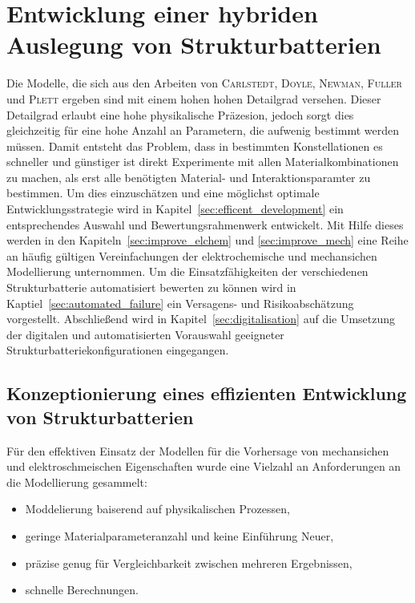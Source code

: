 \chapter{Entwicklung einer hybriden Auslegung von Strukturbatterien}
Die Modelle, die sich aus den Arbeiten von \textsc{Carlstedt}, \textsc{Doyle}, \textsc{Newman}, \textsc{Fuller} und \textsc{Plett} ergeben sind mit einem hohen hohen Detailgrad versehen. Dieser Detailgrad erlaubt eine hohe physikalische Präzesion, jedoch sorgt dies gleichzeitig für eine hohe Anzahl an Parametern, die aufwenig bestimmt werden müssen. Damit entsteht das Problem, dass in bestimmten Konstellationen es schneller und günstiger ist direkt Experimente mit allen Materialkombinationen zu machen, als erst alle benötigten Material- und Interaktionsparamter zu bestimmen. Um dies einzuschätzen und eine möglichst optimale Entwicklungsstrategie wird in Kapitel~\ref{sec:efficent_development} ein entsprechendes Auswahl und Bewertungsrahmenwerk entwickelt. Mit Hilfe dieses werden in den Kapiteln~\ref{sec:improve_elchem} und \ref{sec:improve_mech} eine Reihe an häufig gültigen Vereinfachungen der elektrochemische und mechansichen Modellierung unternommen. Um die Einsatzfähigkeiten der verschiedenen Strukturbatterie automatisiert bewerten zu können wird in Kaptiel~\ref{sec:automated_failure} ein Versagens- und Risikoabschätzung vorgestellt. Abschließend wird in Kapitel~\ref{sec:digitalisation} auf die Umsetzung der digitalen und automatisierten Vorauswahl geeigneter Strukturbatteriekonfigurationen eingegangen.

\section{\label{sec:efficent_development}Konzeptionierung eines effizienten Entwicklung von Strukturbatterien}
Für den effektiven Einsatz der Modellen für die Vorhersage von mechansichen und elektroschmeischen Eigenschaften wurde eine Vielzahl an Anforderungen an die Modellierung gesammelt:
\begin{itemize}
    \item Moddelierung baiserend auf physikalischen Prozessen, %
    \item geringe Materialparameteranzahl und keine Einführung Neuer, %
    \item präzise genug für Vergleichbarkeit zwischen mehreren Ergebnissen, %
    \item schnelle Berechnungen. %
\end{itemize} 

